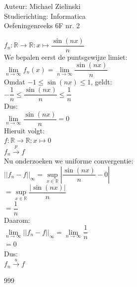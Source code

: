 \documentclass[a4paper]{article}
\begin{document}
  
\noindent \large Auteur: Michael Zielinski \\
\noindent \large Studierichting: Informatica\\
\noindent \large Oefeningenreeks 6F nr. 2\\

\medskip

\normalsize

$ f_n : \mathbb{R} \rightarrow \mathbb{R} : x \mapsto \dfrac{\sin(nx)}{n} $ \\

We bepalen eerst de puntsgewijze limiet: \\

$ \lim\limits_{n \rightarrow \infty} f_n(x)
= \lim\limits_{n \rightarrow \infty} \dfrac{\sin(nx)}{n} $ \\

Omdat $-1 \leq \sin(nx) \leq 1$, geldt: \\

$ -\dfrac{1}{n} \leq \dfrac{\sin(nx)}{n} \leq \dfrac{1}{n} $ \\

Dus: \\

$ \lim\limits_{n \rightarrow \infty} \dfrac{\sin(nx)}{n} = 0 $ \\

Hieruit volgt: \\

$ f : \mathbb{R} \rightarrow \mathbb{R} : x \mapsto 0 $ \\

$ f_n \stackrel{p}{\rightarrow} f $ \\

Nu onderzoeken we uniforme convergentie: \\

$ \left|\left|f_n - f \right|\right|_{\infty}
= \sup\limits_{x \in \mathbb{R}}\left|\dfrac{\sin(nx)}{n} - 0 \right| $ \\

$ = \sup\limits_{x \in \mathbb{R}}\dfrac{|\sin(nx)|}{n} $ \\

$ = \dfrac{1}{n} $ \\

Daarom: \\

$ \lim\limits_{n \rightarrow \infty}\left|\left|f_n - f \right|\right|_{\infty}
= \lim\limits_{n \rightarrow \infty}\dfrac{1}{n} $ \\

$ = 0 $ \\

Dus: \\

$ f_n \stackrel{u}{\rightarrow} f $ \\

\begin{thebibliography}{999}
\end{thebibliography}
\end{document}
